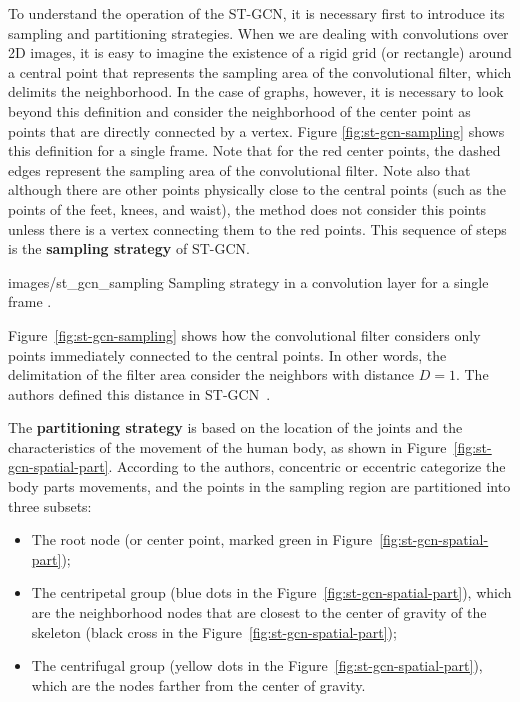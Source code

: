To understand the operation of the ST-GCN, it is necessary first to introduce its sampling and partitioning strategies. When we are dealing with convolutions over 2D images, it is easy to imagine the existence of a rigid grid (or rectangle) around a central point that represents the sampling area of the convolutional filter, which delimits the neighborhood. In the case of graphs, however, it is necessary to look beyond this definition and consider the neighborhood of the center point as points that are directly connected by a vertex. Figure \ref{fig:st-gcn-sampling} shows this definition for a single frame. Note that for the red center points, the dashed edges represent the sampling area of the convolutional filter. Note also that although there are other points physically close to the central points (such as the points of the feet, knees, and waist), the method does not consider this points unless there is a vertex connecting them to the red points. This sequence of steps is the \textbf{sampling strategy} of ST-GCN.

    {images/st_gcn_sampling}
    {Sampling strategy in a convolution layer for a single frame \cite[p. 5]{st-gcn-2018}.}

Figure~\ref{fig:st-gcn-sampling} shows how the convolutional filter considers only points immediately connected to the central points. In other words, the delimitation of the filter area consider the neighbors with distance $D = 1$. The authors defined this distance in ST-GCN~\cite{st-gcn-2018}.

The \textbf{partitioning strategy} is based on the location of the joints and the characteristics of the movement of the human body, as shown in Figure~\ref{fig:st-gcn-spatial-part}. According to the authors, concentric or eccentric categorize the body parts movements, and the points in the sampling region are partitioned into three subsets:
    
\begin{itemize}
    \item The root node (or center point, marked green in Figure~\ref{fig:st-gcn-spatial-part});
    \item The centripetal group (blue dots in the Figure~\ref{fig:st-gcn-spatial-part}), which are the neighborhood nodes that are closest to the center of gravity of the skeleton (black cross in the Figure~\ref{fig:st-gcn-spatial-part});
    \item The centrifugal group (yellow dots in the Figure~\ref{fig:st-gcn-spatial-part}), which are the nodes farther from the center of gravity.
\end{itemize}

